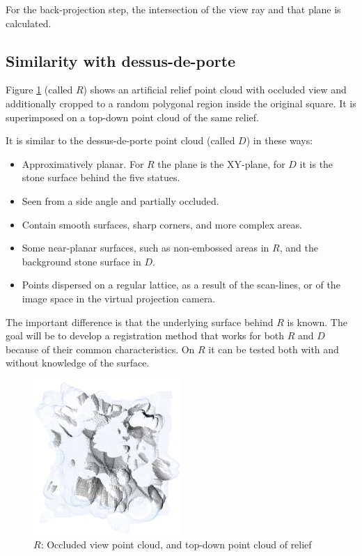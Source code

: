 For the back-projection step, the intersection of the view ray and that plane is calculated.


\subsection{Similarity with dessus-de-porte}
Figure \ref{fig:relief_crop} (called $R$) shows an artificial relief point cloud with occluded view and additionally cropped to a random polygonal region inside the original square. It is superimposed on a top-down point cloud of the same relief.

It is similar to the dessus-de-porte point cloud (called $D$) in these ways:
\begin{itemize}
\item Approximatively planar. For $R$ the plane is the XY-plane, for $D$ it is the stone surface behind the five statues.
\item Seen from a side angle and partially occluded.
\item Contain smooth surfaces, sharp corners, and more complex areas.
\item Some near-planar surfaces, such as non-embossed areas in $R$, and the background stone surface in $D$.
\item Points dispersed on a regular lattice, as a result of the scan-lines, or of the image space in the virtual projection camera.
\end{itemize}

The important difference is that the underlying surface behind $R$ is known. The goal will be to develop a registration method that works for both $R$ and $D$ because of their common characteristics. On $R$ it can be tested both with and without knowledge of the surface.

\begin{figure}[h]
\centering
\includegraphics[width=0.5\textwidth]{fig/r1_crop.png}
\caption{$R$: Occluded view point cloud, and top-down point cloud of relief}
\label{fig:relief_crop}
\end{figure}


